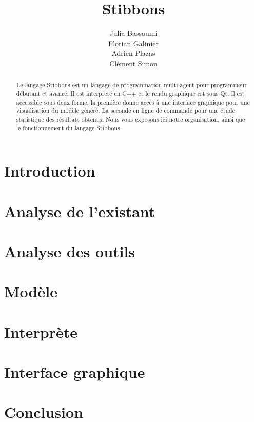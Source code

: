 \documentclass[a4paper,11pt]{report}
\title{Stibbons}
\author{Julia Bassoumi\\Florian Galinier\\Adrien Plazas\\Clément Simon}
\begin{document}
\maketitle
\tableofcontents

\begin{abstract}
Le langage Stibbons est un langage de programmation multi-agent pour programmeur débutant et avancé. Il est interprété en C++ et le rendu graphique est sous Qt. Il est accessible sous deux forme, la première donne accès à une interface graphique pour une visualisation du modèle généré. La seconde en ligne de commande pour une étude statistique des résultats obtenus.
Nous vous exposons ici notre organisation, ainsi que le fonctionnement du langage Stibbons.
\end{abstract}

\chapter{Introduction}


\chapter{Analyse de l'existant}




\chapter{Analyse des outils}







\chapter{Modèle}


\chapter{Interprète}


\chapter{Interface graphique}


\chapter{Conclusion}

\appendix
\end{document}
